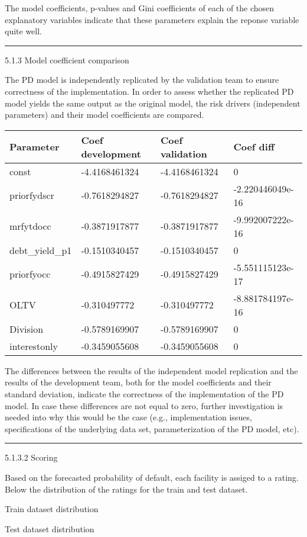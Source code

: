 The model coefficients, p-values and Gini coefficients of each of the
chosen explanatory variables indicate that these parameters explain the
reponse variable quite well.

\begin{center}\rule{0.5\linewidth}{\linethickness}\end{center}

5.1.3 Model coefficient comparison

The PD model is independently replicated by the validation team to
ensure correctness of the implementation. In order to assess whether the
replicated PD model yields the same output as the original model, the
risk drivers (independent parameters) and their model coefficients are
compared.

\begin{longtable}[]{@{}llll@{}}
\toprule
Parameter & Coef development & Coef validation & Coef
diff\tabularnewline
\midrule
\endhead
const & -4.4168461324 & -4.4168461324 & 0\tabularnewline
priorfydscr & -0.7618294827 & -0.7618294827 &
-2.220446049e-16\tabularnewline
mrfytdocc & -0.3871917877 & -0.3871917877 &
-9.992007222e-16\tabularnewline
debt\_yield\_p1 & -0.1510340457 & -0.1510340457 & 0\tabularnewline
priorfyocc & -0.4915827429 & -0.4915827429 &
-5.551115123e-17\tabularnewline
OLTV & -0.310497772 & -0.310497772 & -8.881784197e-16\tabularnewline
Division & -0.5789169907 & -0.5789169907 & 0\tabularnewline
interestonly & -0.3459055608 & -0.3459055608 & 0\tabularnewline
\bottomrule
\end{longtable}

The differences between the results of the independent model replication
and the results of the development team, both for the model coefficients
and their standard deviation, indicate the correctness of the
implementation of the PD model. In case these differences are not equal
to zero, further investigation is needed into why this would be the case
(e.g., implementation issues, specifications of the underlying data set,
parameterization of the PD model, etc).

\begin{center}\rule{0.5\linewidth}{\linethickness}\end{center}

5.1.3.2 Scoring

Based on the forecasted probability of default, each facility is assiged
to a rating. Below the distribution of the ratings for the train and
test dataset.

Train dataset distribution

Test dataset distribution
